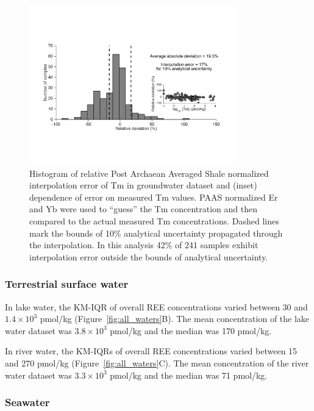 \begin{figure}[htbp]
\begin{center}
\includegraphics[width=0.8\textwidth]{Ch3_figures/Tm-interpolation-error.pdf}
\caption{Histogram of relative Post Archaean Averaged Shale normalized interpolation error of Tm in groundwater dataset and (inset) dependence of error on measured Tm values.
PAAS normalized Er and Yb were used to ``guess'' the Tm concentration and then compared to the actual measured Tm concentrations. Dashed lines mark the bounds of 10\% analytical uncertainty propagated through the interpolation.
In this analysis 42\% of 241 samples exhibit interpolation error outside the bounds of analytical uncertainty. }\label{fig:interp_error}
\end{center}
\end{figure}

\subsubsection{Terrestrial surface water}

In lake water, the KM-IQR of overall REE concentrations varied between 30 and $1.4\times10^3$ pmol/kg (Figure~\ref{fig:all_waters}B).
The mean concentration of the lake water dataset was $3.8\times10^3$ pmol/kg and the median was 170 pmol/kg.

In river water, the KM-IQRs of overall REE concentrations varied between 15 and 270 pmol/kg (Figure~\ref{fig:all_waters}C).
The mean concentration of the river water dataset was $3.3\times10^3$ pmol/kg and the median was 71 pmol/kg.

\subsubsection{Seawater}

